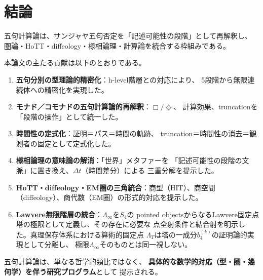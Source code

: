 \documentclass[11pt,a4paper]{ltjsarticle}
\theoremstyle{remark}
\newcommand{\LawvereInfinity}{\Lambda_\infty}
\newcommand{\ArithmeticFixedPoint}{\Lambda_T}
\begin{document}
\section{結論}

五句計算論は、サンジャヤ五句否定を「記述可能性の段階」として再解釈し、
圏論・HoTT・diffeology・様相論理・計算論を統合する枠組みである。

本論文の主たる貢献は以下のとおりである。
\begin{enumerate}
  \item \textbf{五句分別の型理論的精密化}：h-level階層との対応により、
  5段階から無限連続体への精密化を実現した。
  \item \textbf{モナド／コモナドの五句計算論的再解釈}：$\Box/\Diamond$、
  計算効果、truncationを「段階の操作」として統一した。
  \item \textbf{時間性の定式化}：証明＝パス＝時間の軌跡、
  truncation＝時間性の消去＝観測者の固定として定式化した。
  \item \textbf{様相論理の意味論の解消}：「世界」メタファーを
  「記述可能性の段階の文脈」に置き換え、$\Delta t$（時間差分）による
  三重分解を提示した。
  \item \textbf{HoTT・diffeology・EM圏の三角統合}：商型（HIT）、商空間
  （diffeology）、商代数（EM圏）の形式的対応を提示した。
  \item \textbf{Lawvere無限階層の統合}：$\LawvereInfinity$を$S_4$の
  pointed objectsからなるLawvere固定点塔の極限として定義し、その存在に必要な
  点全射条件と結合射を明示した。真理保存体系における算術的固定点
  $\ArithmeticFixedPoint$は塔の一成分$b_4^{(k)}$の証明論的実現として分離し、
  極限$\LawvereInfinity$そのものとは同一視しない。
\end{enumerate}

五句計算論は、単なる哲学的類比ではなく、
\textbf{具体的な数学的対応（型・圏・幾何学）を伴う研究プログラム}として
提示される。
\end{document}
